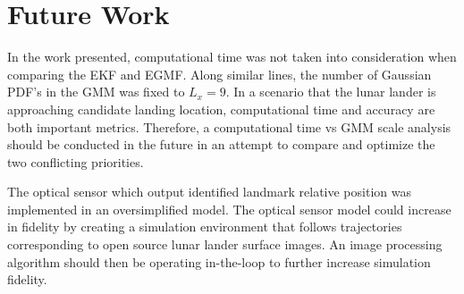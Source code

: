 \documentclass[conf]{new-aiaa}
\begin{document}
\section{Future Work}
In the work presented, computational time was not taken into consideration when comparing the EKF and EGMF. Along similar lines, the number of Gaussian PDF's in the GMM was fixed to $L_x = 9$. In a scenario that the lunar lander is approaching candidate landing location, computational time and accuracy are both important metrics. Therefore, a computational time vs GMM scale analysis should be conducted in the future in an attempt to compare and optimize the two conflicting priorities.

The optical sensor which output identified landmark relative position was implemented in an oversimplified model. The optical sensor model could increase in fidelity by creating a simulation environment that follows trajectories corresponding to open source lunar lander surface images. An image processing algorithm should then be operating in-the-loop to further increase simulation fidelity. 
\end{document}

